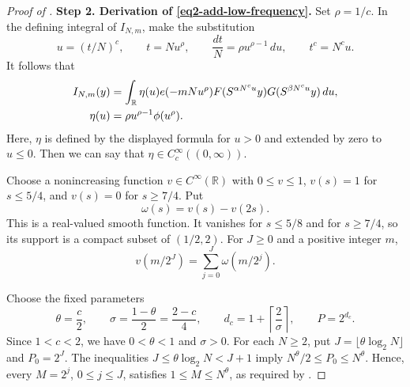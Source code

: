 \documentclass[reqno,12pt]{amsart}
\def \R {\mathbb R}
\numberwithin{equation}{section}
\begin{document}
\begin{proof}[Proof of ]
\medskip
\noindent\textbf{Step 2. Derivation of \eqref{eq2-add-low-frequency}.}
Set $\rho=1/c$. In the defining integral of $I_{N,m}$, make the
substitution
\[
 u=(t/N)^c,\qquad t=Nu^\rho,\qquad
 \frac{dt}{N}=\rho u^{\rho-1}\,du,\qquad t^c=N^cu.
\]
It follows that
\begin{align}
 I_{N,m}(y)
 &=\int_\R\eta(u)e(-mNu^\rho)
 F(S^{\alpha N^cu}y)G(S^{\beta N^cu}y)\,du,
 \label{eq2-add-poisson-mode}\\
 \eta(u)&=\rho u^{\rho-1}\phi(u^\rho).
 \notag
\end{align}
Here, $\eta$ is defined by the displayed formula for $u>0$ and extended
by zero to $u\le0$. Then we can say that $\eta\in C_c^\infty((0,\infty))$.

Choose a nonincreasing function $v\in C^\infty(\R)$ with $0\le v\le1$,
$v(s)=1$ for $s\le5/4$, and $v(s)=0$ for $s\ge7/4$. Put
\[
 \omega(s)=v(s)-v(2s).
\]
This is a real-valued smooth function. It vanishes for $s\le5/8$ and
for $s\ge7/4$, so its support is a compact subset of $(1/2,2)$.
For $J\ge0$ and a positive integer $m$, 
\begin{equation}
 v(m/2^J)=\sum_{j=0}^J\omega(m/2^j).
 \label{eq2-add-dyadic-identity}
\end{equation}

Choose the fixed parameters
\begin{equation}
 \theta=\frac c2,\qquad \sigma=\frac{1-\theta}{2}=\frac{2-c}{4},
 \qquad d_c=1+\left\lceil\frac2\sigma\right\rceil,
 \qquad P=2^{d_c}.
 \label{eq2-add-fixed-parameters}
\end{equation}
Since $1<c<2$, we have $0<\theta<1$ and $\sigma>0$. For each $N\ge2$,
put $J=\lfloor\theta\log_2N\rfloor$ and $P_0=2^J$. The inequalities
$J\le\theta\log_2N<J+1$ imply
$
N^\theta/2\le P_0\le N^\theta.
$
Hence, every $M=2^j$, $0\le j\le J$, satisfies
$1\le M\le N^\theta$, as required by .


\end{proof}
\end{document}
